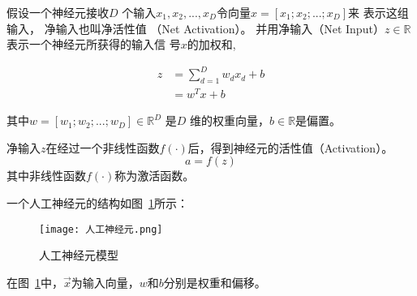 
假设一个神经元接收$𝐷$ 个输入$x_1,x_2,...,x_D$令向量$x=[x_1;x_2;...;x_D]$来
表示这组输入， 净输入也叫净活性值
（Net Activation）。
并用净输入（Net Input）$z\in \mathbb{R}$表示一个神经元所获得的输入信
号$x$的加权和,

\begin{equation}
\begin{aligned}    
    z &= \sum_{d=1}^D w_d x_d + b \\
      &= w^Tx + b        
\end{aligned}    
\end{equation}

其中$w=[w_1;w_2;...;w_D] \in \mathbb{R}^D$ 是$𝐷$ 维的权重向量，$b\in \mathbb{R}$是偏置。


净输入$𝑧$在经过一个非线性函数$f(\cdot)$后，得到神经元的活性值（Activation）。
\begin{equation}
    a = f(z)
\end{equation}
其中非线性函数$f(\cdot)$称为激活函数。

一个人工神经元的结构如图~\ref{fig:神经元}所示：
\begin{figure}
    \centering
    \texttt{[image: 人工神经元.png]}
    \caption{人工神经元模型}
    \label{fig:神经元}
  \end{figure}

在图~\ref{fig:神经元}中，$\vec{x}$为输入向量，$w$和$b$分别是权重和偏移。


